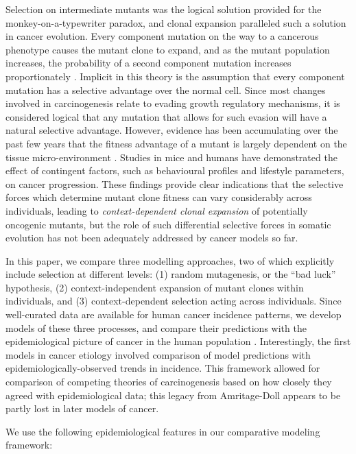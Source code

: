 \documentclass[9pt,onecolumn,twoside]{pnas-new}
\begin{document}
Selection on intermediate mutants was the logical solution provided for the monkey-on-a-typewriter paradox, and clonal expansion paralleled such a solution in cancer evolution. Every component mutation on the way to a cancerous phenotype causes the mutant clone to expand, and as the mutant population increases, the probability of a second component mutation increases proportionately \cite{Nowell1976}. Implicit in this theory is the assumption that every component mutation has a selective advantage over the normal cell. Since most changes involved in carcinogenesis relate to evading growth regulatory mechanisms, it is considered logical that any mutation that allows for such evasion will have a natural selective advantage. However, evidence has been accumulating over the past few years that the fitness advantage of a mutant is largely dependent on the tissue micro-environment \cite{Hanahan2012, Pietras2010}. Studies in mice \cite{Cao2010} and humans \cite{Rundqvist2013} have demonstrated the effect of contingent factors, such as behavioural profiles and lifestyle parameters, on cancer progression. These findings provide clear indications that the selective forces which determine mutant clone fitness can vary considerably across individuals, leading to \textit{context-dependent clonal expansion} of potentially oncogenic mutants, but the role of such differential selective forces in somatic evolution has not been adequately addressed by cancer models so far.

In this paper, we compare three modelling approaches, two of which explicitly include selection at different levels: (1) random mutagenesis, or the ``bad luck'' hypothesis, (2) context-independent expansion of mutant clones within individuals, and (3) context-dependent selection acting across individuals. Since well-curated data are available for human cancer incidence patterns, we develop models of these three processes, and compare their predictions with the epidemiological picture of cancer in the human population \cite{AmericanCancerSociety2016}. Interestingly, the first models in cancer etiology involved comparison of model predictions with epidemiologically-observed trends in incidence. This framework allowed for comparison of competing theories of carcinogenesis based on how closely they agreed with epidemiological data; this legacy from Amritage-Doll appears to be partly lost in later models of cancer.

We use the following epidemiological features in our comparative modeling framework:
\end{document}
